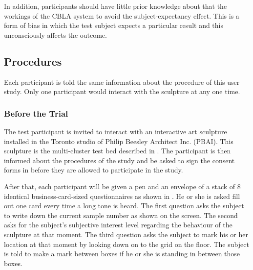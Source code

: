 In addition, participants should have little prior knowledge about that the workings of the CBLA system to avoid the subject-expectancy effect. This is a form of bias in which the test subject expects a particular result and this unconsciously affects the outcome. 

\subsection{Procedures}\label{sec:user-study-procedure}

Each participant is told the same information about the procedure of this user study. Only one participant would interact with the sculpture at any one time. 

\subsubsection{Before the Trial}

The test participant is invited to interact with an interactive art sculpture installed in the Toronto studio of Philip Beesley Architect Inc. (PBAI). This sculpture is the multi-cluster test bed described in . The participant is then informed about the procedures of the study and be asked to sign the consent forms in  before they are allowed to participate in the study. 

After that, each participant will be given a pen and an envelope of a stack of 8 identical business-card-sized questionnaires as shown in . He or she is asked fill out one card every time a long tone is heard. The first question asks the subject to write down the current sample number as shown on the screen. The second asks for the subject's subjective interest level regarding the behaviour of the sculpture at that moment. The third question asks the subject to mark his or her location at that moment by looking down on to the grid on the floor. The subject is told to make a mark between boxes if he or she is standing in between those boxes. 

